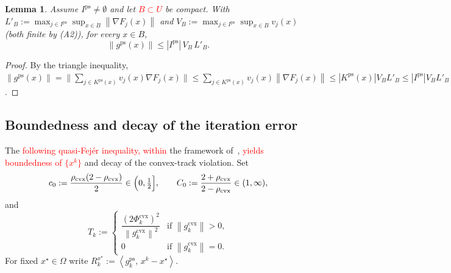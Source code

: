 \documentclass[]{interact}
\theoremstyle{plain}
\newtheorem{lemma}[theorem]{Lemma}
\theoremstyle{definition}
\theoremstyle{remark}
\newcommand{\norm}[1]{\left\lVert #1 \right\rVert}
\newcommand{\abs}[1]{\left\lvert #1 \right\rvert}
\newcommand{\inner}[2]{\left\langle #1,\, #2 \right\rangle}
\newcommand{\cvx}{\mathrm{cvx}}
\newcommand{\ps}{\mathrm{ps}}
\begin{document}
\begin{lemma}\label{lem:bound-ps}
Assume $I^{\ps}\ne\emptyset$ and let \leavevmode\textcolor{red}{$B\subset U$} be compact. With
$L'_B:=\max_{j\in I^{\ps}}\sup_{x\in B}\norm{\nabla F_j(x)}$ and
$V_B:=\max_{j\in I^{\ps}}\sup_{x\in B}v_j(x)$ (both finite by (A2)), for every $x\in B$,
\[
\norm{g^{\ps}(x)}\le\abs{I^{\ps}}\,V_B\,L'_B .
\]
\end{lemma}
\begin{proof}
By the triangle inequality,
$\norm{g^{\ps}(x)}=\bigl\|\sum_{j\in K^{\ps}(x)}v_j(x)\nabla F_j(x)\bigr\|
\le\sum_{j\in K^{\ps}(x)}v_j(x)\norm{\nabla F_j(x)}\le\abs{K^{\ps}(x)}V_BL'_B
\le\abs{I^{\ps}}V_BL'_B$.
\end{proof}

\subsection{Boundedness and decay of the iteration error}\label{ssec:bounded}
The \leavevmode\textcolor{red}{following quasi-Fej\'er inequality, within} the framework of~\citet{combettes2001quasifejer}, \leavevmode\textcolor{red}{yields boundedness of $\{x^k\}$} and decay of the convex-track violation. Set
\begin{equation}\label{eq:c0C0}
c_0:=\frac{\rho_{\cvx}(2-\rho_{\cvx})}{2}\in\Bigl(0,\tfrac12\Bigr],\qquad
C_0:=\frac{2+\rho_{\cvx}}{2-\rho_{\cvx}}\in(1,\infty),
\end{equation}
and
\begin{equation}\label{eq:Tk}
T_k:=\begin{cases}\dfrac{(2\Phi^{\cvx}_k)^2}{\norm{g^{\cvx}_k}^2} & \text{if }\norm{g^{\cvx}_k}>0,\\ 0 & \text{if }\norm{g^{\cvx}_k}=0.\end{cases}
\end{equation}
For fixed $x^\star\in\Omega$ write $R^{x^\star}_k:=\inner{g^{\ps}_k}{x^k-x^\star}$.
\end{document}
